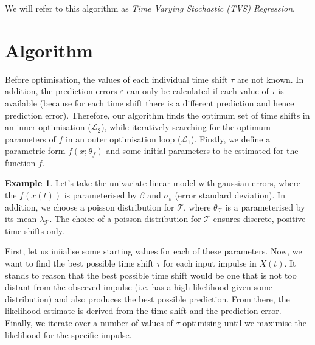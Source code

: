 \documentclass[11pt]{amsart}
\theoremstyle{definition}
\newtheorem{example}{Example}[section]
\begin{document}
We will refer to this algorithm as {\em Time Varying Stochastic (TVS) Regression}.

\section{Algorithm}

Before optimisation, the values of each individual time shift $\tau$ are not known. In addition, the prediction errors $\varepsilon$ can only be calculated if each value of $\tau$ is available (because for each time shift there is a different prediction and hence prediction error). Therefore, our algorithm finds the optimum set of time shifts in an inner optimisation ($\mathcal{L}_2$), while iteratively searching for the optimum parameters of $f$ in an outer optimisation loop ($\mathcal{L}_1$). 
Firstly, we define a parametric form $f(x;\theta_f)$ and some initial parameters to be estimated for the function $f$. 

\begin{example}\label{example:poisson}
Let's take the univariate linear model with gaussian errors, where the $f(x(t))$ is parameterised by $\beta$ and $\sigma_{\varepsilon}$ (error standard deviation). In addition, we choose a poisson distribution for $\mathcal{T}$, where $\theta_{\mathcal{T}}$ is a parameterised by its mean $\lambda_{\mathcal{T}}$. The choice of a poisson distribution for $\mathcal{T}$
ensures discrete, positive time shifts only.
\end{example}


First, let us iniialise some starting values for each of these parameters. Now, we want to find the best possible time shift $\tau$ for each input impulse in $X(t)$. It stands to reason that the best possible time shift would be one that is not too distant from the observed impulse (i.e. has a high likelihood given some distribution) and also produces the best possible prediction. From there, the likelihood estimate is derived from the time shift and the prediction error.
Finally, we iterate over a number of values of $\tau$ optimising until we maximise the likelihood for the specific impulse.
\end{document}
